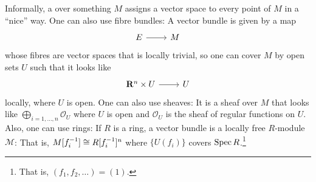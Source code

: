 \documentclass [11 pt, oneside] {article}
\begin{document}
Informally, a  over something $M$ assigns a vector space to every point of $M$ in a ``nice'' way. One can also use fibre bundles: A vector bundle is given by a map
\[
\begin{tikzcd}
	E\ar[r]&M
\end{tikzcd}
\]
whose fibres are vector spaces that is locally trivial, so one can cover $M$ by open sets $U$ such that it looks like
\[
\begin{tikzcd}
	\mathbf{R}^n \times U\ar[r] & U
\end{tikzcd}
\]
locally, where $U$ is open. One can also use sheaves: It is a sheaf over $M$ that looks like $\bigoplus_{i=1,\hdots, n}\mathscr{O}_U$ where $U$ is open and $\mathscr{O}_U$ is the sheaf of regular functions on $U$. Also, one can use rings: If $R$ is a ring, a vector bundle is a locally free $R$-module $\mathscr{M}$: That is, $\relax{M}[f_i^{-1}] \cong R[f_i^{-1}]^n$ where $\{U(f_i)\}$ covers $\operatorname{Spec} R$.\footnote{That is, $(f_1,f_2,\hdots)=(1)$.}
\end{document}

